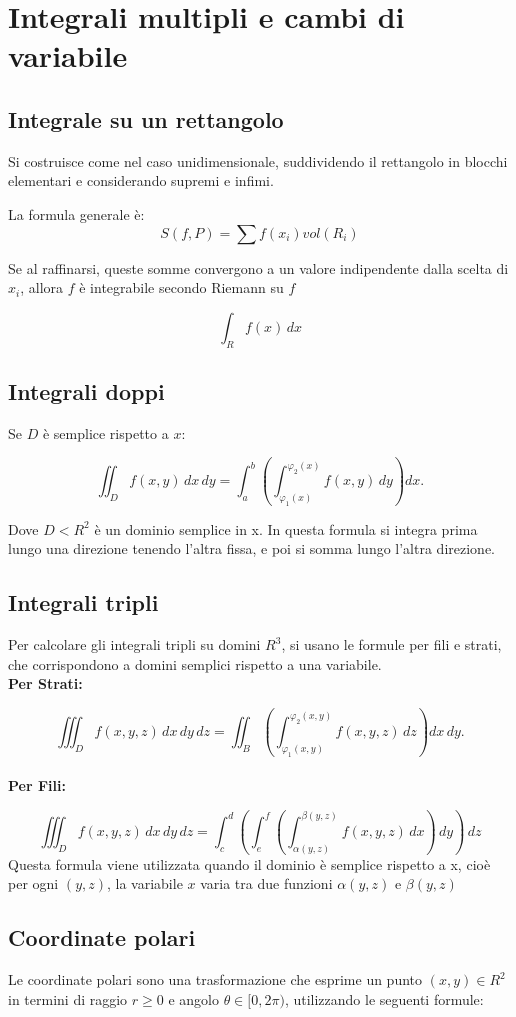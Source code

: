\documentclass[a4paper,12pt]{article}
\begin{document}
\section{Integrali multipli e cambi di variabile}

\subsection{Integrale su un rettangolo}
Si costruisce come nel caso unidimensionale, suddividendo il rettangolo in blocchi elementari e considerando supremi e infimi.

La formula generale è: 
\[S(f, P) = \sum f(x_i) vol(R_i)\]  

Se al raffinarsi, queste somme convergono a un valore indipendente dalla scelta di $x_i$, allora $f$ è integrabile secondo Riemann su $f$

\[\int_R f(x)\,dx\]
\subsection{Integrali doppi}
Se $D$ è semplice rispetto a $x$:


\[
\iint_D f(x,y)\,dx\,dy=\int_a^b\left(\int_{\varphi_1(x)}^{\varphi_2(x)} f(x,y)\,dy\right)dx.
\]

Dove $D<R^2$ è un dominio semplice in x. In questa formula si integra prima lungo una direzione tenendo l'altra fissa, e poi si somma lungo l'altra direzione.


\subsection{Integrali tripli}
Per calcolare gli integrali tripli su domini $R^3$, si usano le formule per fili e strati, che corrispondono a domini semplici rispetto a una variabile.\\ 
\textbf{Per Strati:}

\[
\iiint_D f(x,y,z)\,dx\,dy\,dz=\iint_B\left(\int_{\varphi_1(x,y)}^{\varphi_2(x,y)} f(x,y,z)\,dz\right)dx\,dy.
\]\\

\textbf{Per Fili:}

\[
\iiint_Df(x,y,z)\,dx\,dy\,dz = \int_c^d(\int_e^f(\int_{\alpha(y,z)}^{\beta(y,z)} f(x,y,z)\,dx)\,dy)\,dz
\]
Questa formula viene utilizzata quando il dominio è semplice rispetto a x, cioè per ogni $(y,z)$, la variabile $x$ varia tra due funzioni $\alpha(y,z)$ e $\beta(y,z)$
\subsection{Coordinate polari}
Le coordinate polari sono una trasformazione che esprime un punto $(x,y) \in R^2$ in termini di raggio $r \geq 0$ e angolo $\theta \in [0, 2\pi)$, utilizzando le seguenti formule:
\end{document}

